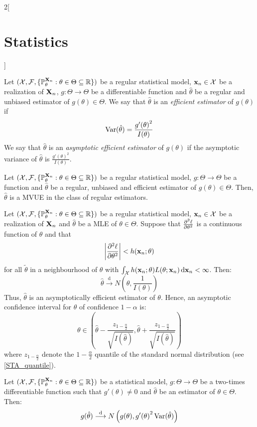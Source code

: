 \documentclass[../../../main.tex]{subfiles}
\begin{document}
\begin{multicols}{2}[\section{Statistics}]
  \begin{definition}
    Let $(\mathcal{X},\mathcal{F},\{\mathbb{P}_{\theta}^{\boldsymbol{\mathrm{X}}_n}:\theta\in\Theta\subseteq\mathbb{R}\})$ be a regular statistical model, $\boldsymbol{\mathrm{x}}_n\in\mathcal{X}$ be a realization of $\boldsymbol{\mathrm{X}}_n$, $g:\Theta\rightarrow\Theta$ be a differentiable function and ${\hat\theta}$ be a regular and unbiased estimator of $g({\theta})\in\Theta$. We say that $\hat\theta$ is an \emph{efficient estimator} of $g(\theta)$ if $$\operatorname{Var}(\hat\theta)=\frac{{g'(\theta)}^2}{I(\theta)}$$
    We say that $\hat\theta$ is an \emph{asymptotic efficient estimator} of $g(\theta)$ if the asymptotic variance of $\hat\theta$ is $\frac{{g'(\theta)}^2}{I(\theta)}$.
  \end{definition}
  \begin{proposition}
    Let $(\mathcal{X},\mathcal{F},\{\mathbb{P}_{\theta}^{\boldsymbol{\mathrm{X}}_n}:\theta\in\Theta\subseteq\mathbb{R}\})$ be a regular statistical model, $g:\Theta\rightarrow\Theta$ be a function and ${\hat\theta}$ be a regular, unbiased and efficient estimator of $g({\theta})\in\Theta$. Then, $\hat\theta$ is a MVUE in the class of regular estimators.
  \end{proposition}
  \begin{theorem}
    Let $(\mathcal{X},\mathcal{F},\{\mathbb{P}_{\theta}^{\boldsymbol{\mathrm{X}}_n}:\theta\in\Theta\subseteq \mathbb{R}\})$ be a regular statistical model, $\boldsymbol{\mathrm{x}}_n\in\mathcal{X}$ be a realization of $\boldsymbol{\mathrm{X}}_n$ and ${\hat\theta}$ be a MLE of ${\theta}\in\Theta$. Suppose that $\pdv[2]{\ell}{\theta}$ is a continuous function of $\theta$ and that $$\left|\pdv[2]{\ell}{\theta}(\tilde{\theta};\boldsymbol{\mathrm{x}}_n)\right|<h(\boldsymbol{\mathrm{x}}_n;\theta)$$
    for all $\tilde{\theta}$ in a neighbourhood of $\theta$ with $\int_\mathcal{X}h(\boldsymbol{\mathrm{x}}_n;\theta)L(\theta;\boldsymbol{\mathrm{x}}_n)\dd{\boldsymbol{\mathrm{x}}_n}<\infty$. Then:
    $$\hat\theta\overset{\text{d}}{\longrightarrow}N\left(\theta,\frac{1}{I(\theta)}\right)$$
    Thus, ${\hat\theta}$ is an asymptotically efficient estimator of $\theta$. Hence, an asymptotic confidence interval for $\theta$ of confidence $1-\alpha$ is:
    $$\theta\in\left(\hat\theta-\frac{z_{1-\frac{\alpha}{2}}}{\sqrt{I(\hat\theta)}},\hat\theta+\frac{z_{1-\frac{\alpha}{2}}}{\sqrt{I(\hat\theta)}}\right)$$
    where $z_{1-\frac{\alpha}{2}}$ denote the $1-\frac{\alpha}{2}$ quantile of the standard normal distribution (see \cref{STA_quantile}).
  \end{theorem}
  \begin{theorem}
    Let $(\mathcal{X},\mathcal{F},\{\mathbb{P}_{\theta}^{\boldsymbol{\mathrm{X}}_n}:\theta\in\Theta\subseteq\mathbb{R}\})$ be a statistical model, $g:\Theta\rightarrow\Theta$ be a two-times differentiable function such that $g'(\theta)\ne 0$ and $\hat\theta$ be an estimator of $\theta\in\Theta$. Then:
    $$g(\hat\theta)\overset{\text{d}}{\longrightarrow}N\left(g(\theta),{g'(\theta)}^2\operatorname{Var}(\hat\theta)\right)$$
  \end{theorem}

\end{multicols}
\end{document}

